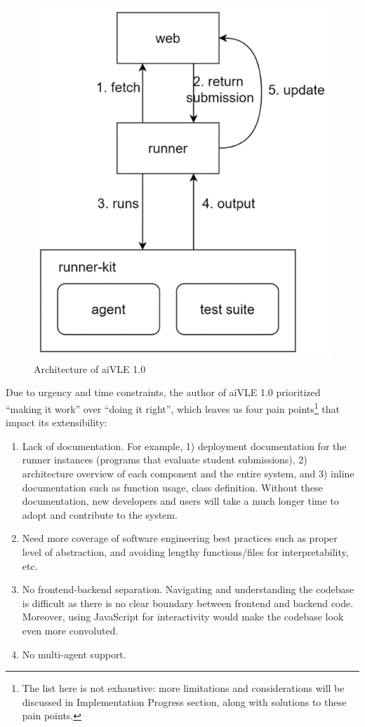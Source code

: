 \documentclass[fyp]{socreport}
\begin{document}
\begin{figure}[H]
    \centering
    \includegraphics{images/aivle_1_arch.png}
    \caption{Architecture of aiVLE 1.0}
    \label{fig:aivle-1-arch}
\end{figure}

Due to urgency and time constraints, the author of aiVLE 1.0 prioritized “making it work” over “doing it right”, which leaves us four pain points\footnote{The list here is not exhaustive: more limitations and considerations will be discussed in Implementation Progress section, along with solutions to these pain points.} that impact its extensibility:

\begin{enumerate}
    \item Lack of documentation. For example, 1) deployment documentation for the runner instances (programs that evaluate student submissions), 2) architecture overview of each component and the entire system, and 3) inline documentation such as function usage, class definition. Without these documentation, new developers and users will take a much longer time to adopt and contribute to the system. 
    \item Need more coverage of software engineering best practices such as proper level of abstraction, and avoiding lengthy functions/files for interpretability, etc.
    \item No frontend-backend separation. Navigating and understanding the codebase is difficult as there is no clear boundary between frontend and backend code. Moreover, using JavaScript for interactivity would make the codebase look even more convoluted.
    \item No multi-agent support.
\end{enumerate}
\end{document}
